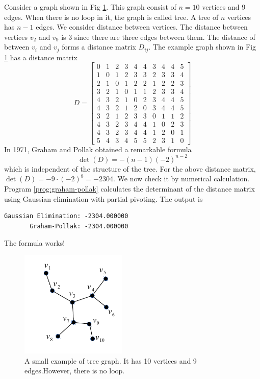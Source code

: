 Consider a graph shown in Fig \ref{fig:tree-graph}.  This graph consist of $n=10$ vertices and 9 edges.   When there is no loop in it, the graph is called tree.   A tree of $n$ vertices has $n-1$ edges.
We consider distance between vertices.  The distance between vertices $v_2$ and $v_9$ is 3 since there are three edges between them.
The distance of between $v_i$ and $v_j$ forms a distance matrix $D_{ij}$.  The example graph shown in Fig \ref{fig:tree-graph} has a distance matrix
\begin{equation}
D=
\begin{bmatrix}
0 & 1 & 2 & 3 & 4 & 4 & 3 & 4 & 4 & 5 \\
1 & 0 & 1 & 2 & 3 & 3 & 2 & 3 & 3 & 4 \\
2 & 1 & 0 & 1 & 2 & 2 & 1 & 2 & 2 & 3 \\
3 & 2 & 1 & 0 & 1 & 1 & 2 & 3 & 3 & 4 \\
4 & 3 & 2 & 1 & 0 & 2 & 3 & 4 & 4 & 5 \\
4 & 3 & 2 & 1 & 2 & 0 & 3 & 4 & 4 & 5 \\
3 & 2 & 1 & 2 & 3 & 3 & 0 & 1 & 1 & 2 \\
4 & 3 & 2 & 3 & 4 & 4 & 1 & 0 & 2 & 3 \\
4 & 3 & 2 & 3 & 4 & 4 & 1 & 2 & 0 & 1 \\
5 & 4 & 3 & 4 & 5 & 5 & 2 & 3 & 1 & 0
\end{bmatrix}
\end{equation}
In 1971, Graham and Pollak obtained a remarkable formula\cite{graham-pollak,graham-pollak2}
\begin{equation}
\det(D) = -(n-1) (-2)^{n-2}
\end{equation}
which is independent of the structure of the tree.  For the above distance matrix, $\det(D)=-9 \cdot (-2)^8 = -2304$.  We now check it by numerical calculation.  Program \ref{prog:graham-pollak} calculates the determinant of the distance matrix using Gaussian elimination with partial pivoting. The output is
\begin{mybox}
\small
\begin{verbatim}
Gaussian Elimination: -2304.000000
       Graham-Pollak: -2304.000000
\end{verbatim}
\normalsize
\end{mybox}
The formula works!

\begin{figure}
\centering
\includegraphics[width=2.0in]{08.matrix1/tree-graph.pdf}
\caption{A small example of tree graph.  It has 10 vertices and 9 edges.However, there is no loop.}
\label{fig:tree-graph}
\end{figure}
\newpage
